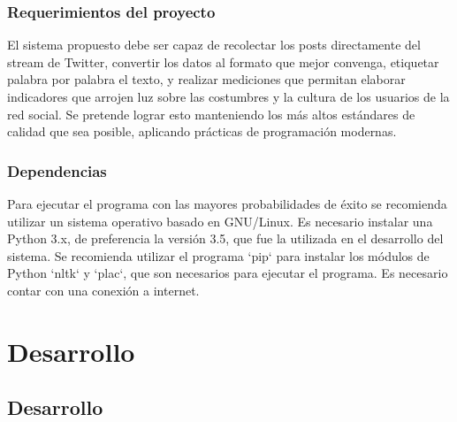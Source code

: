 \documentclass[oneside]{book}
\begin{document}
\subsection{Requerimientos del proyecto}
El sistema propuesto debe ser capaz de recolectar los posts directamente del
stream de Twitter, convertir los datos al formato que mejor convenga, etiquetar
palabra por palabra el texto, y realizar mediciones que permitan elaborar
indicadores que arrojen luz sobre las costumbres y la cultura de los usuarios
de la red social. Se pretende lograr esto manteniendo los más altos estándares
de calidad que sea posible, aplicando prácticas de programación modernas.

\subsection{Dependencias}
Para ejecutar el programa con las mayores probabilidades de éxito se recomienda
utilizar un sistema operativo basado en GNU/Linux. Es necesario instalar una
Python 3.x, de preferencia la versión 3.5, que fue la utilizada en el
desarrollo del sistema. Se recomienda utilizar el programa `pip` para instalar
los módulos de Python `nltk` y `plac`, que son necesarios para ejecutar el
programa. Es necesario contar con una conexión a internet.

\chapter{Desarrollo}
\section{Desarrollo}
\end{document}
